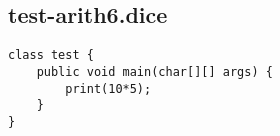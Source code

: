 \subsection{test-arith6.dice}
\begin{verbatim}
class test {
	public void main(char[][] args) {
		print(10*5);
	}
}

\end{verbatim}